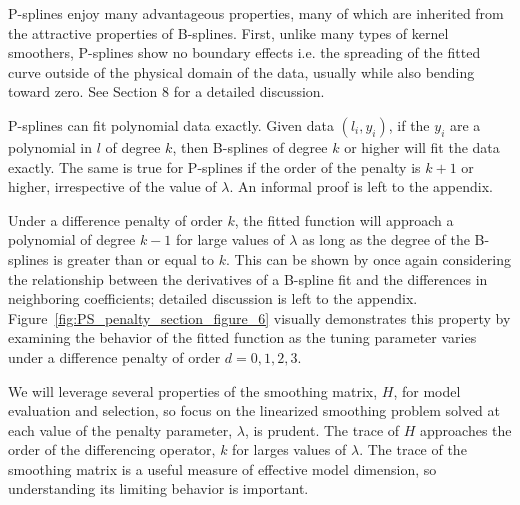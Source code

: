 \documentclass[12pt]{article}
\theoremstyle{definition}
\begin{document}
P-splines enjoy many advantageous properties, many of which are inherited from the attractive properties of B-splines. First, unlike many types of kernel smoothers, P-splines show no boundary effects i.e. the spreading of the fitted curve outside of the physical domain of the data, usually while also bending toward zero. See \citet{eilers1996flexible} Section 8 for a detailed discussion.

P-splines can fit polynomial data exactly. Given data $\left(l_i,y_i\right)$, if the $y_i$ are a polynomial in $l$ of degree $k$, then B-splines of degree $k$ or higher will fit the data exactly.  The same is true for P-splines if the order of the penalty is $k+1$ or higher, irrespective of the value of $\lambda$. An informal proof is left to the appendix.

Under a difference penalty of order $k$, the fitted function will approach a polynomial of degree $k-1$ for large values of $\lambda$ as long as the degree of the B-splines is greater than or equal to $k$. This can be shown by once again considering the relationship between the derivatives of a B-spline fit and the differences in neighboring coefficients; detailed discussion is left to the appendix. Figure~\ref{fig:PS_penalty_section_figure_6} visually demonstrates this property by examining the behavior of the fitted function as the tuning parameter varies under a difference penalty of order $d=0,1,2,3$.

We will leverage several properties of the smoothing matrix, $H$, for model evaluation and selection, so focus on the linearized smoothing problem solved at each value of the penalty parameter, $\lambda$, is prudent. The trace of $H$ approaches the order of the differencing operator, $k$ for larges values of $\lambda$. The trace of the smoothing matrix is a useful measure of effective model dimension, so understanding its limiting behavior is important. 
\end{document}

